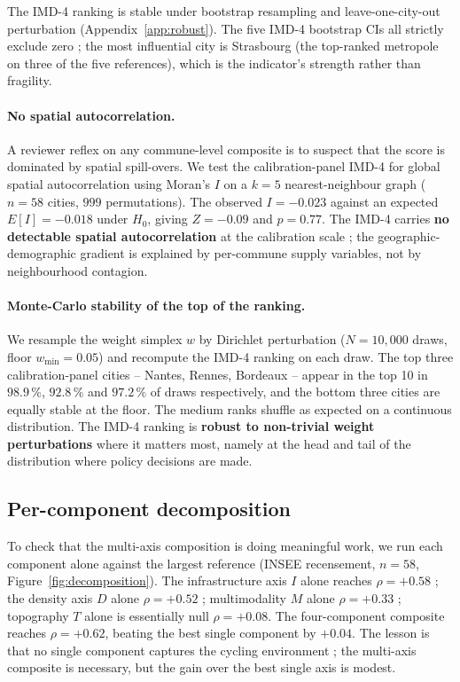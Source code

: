\documentclass[11pt,a4paper]{article}
\begin{document}
The IMD-4 ranking is stable under bootstrap resampling and
leave-one-city-out perturbation (Appendix~\ref{app:robust}).  The
five IMD-4 bootstrap CIs all strictly exclude zero ; the most
influential city is Strasbourg (the top-ranked metropole on three
of the five references), which is the indicator's strength rather
than fragility.

\paragraph{No spatial autocorrelation.}
A reviewer reflex on any commune-level composite is to suspect that
the score is dominated by spatial spill-overs.  We test the
calibration-panel IMD-4 for global spatial autocorrelation using
Moran's $I$ on a $k = 5$ nearest-neighbour graph ($n = 58$ cities,
$999$ permutations).  The observed $I = -0.023$ against an expected
$E[I] = -0.018$ under $H_0$, giving $Z = -0.09$ and $p = 0.77$.
The IMD-4 carries \textbf{no detectable spatial autocorrelation}
at the calibration scale ; the geographic-demographic gradient is
explained by per-commune supply variables, not by neighbourhood
contagion.

\paragraph{Monte-Carlo stability of the top of the ranking.}
We resample the weight simplex $w$ by Dirichlet perturbation
($N = 10{,}000$ draws, floor $w_{\min} = 0.05$) and recompute the
IMD-4 ranking on each draw.  The top three calibration-panel
cities -- Nantes, Rennes, Bordeaux -- appear in the top 10 in
$98.9\,\%$, $92.8\,\%$ and $97.2\,\%$ of draws respectively, and
the bottom three cities are equally stable at the floor.  The
medium ranks shuffle as expected on a continuous distribution.
The IMD-4 ranking is \textbf{robust to non-trivial weight
perturbations} where it matters most, namely at the head and tail
of the distribution where policy decisions are made.

\subsection{Per-component decomposition}

To check that the multi-axis composition is doing meaningful work,
we run each component alone against the largest reference (INSEE
recensement, $n=58$, Figure~\ref{fig:decomposition}).  The
infrastructure axis $I$ alone reaches $\rho = +0.58$ ; the density
axis $D$ alone $\rho = +0.52$ ; multimodality $M$ alone $\rho = +0.33$ ;
topography $T$ alone is essentially null $\rho = +0.08$.  The
four-component composite reaches $\rho = +0.62$, beating the best
single component by $+0.04$.  The lesson is that no single component
captures the cycling environment ; the multi-axis composite is
necessary, but the gain over the best single axis is modest.
\end{document}
